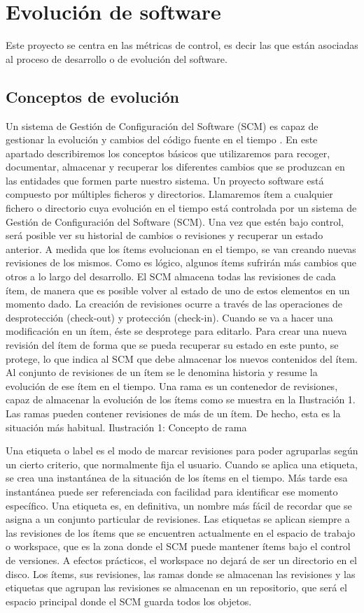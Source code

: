\section{Evolución de software}
Este proyecto se centra en las métricas de control, es decir las que están asociadas al proceso de desarrollo o de evolución del software.
\subsection{Conceptos de evolución}
Un sistema de Gestión de Configuración del Software (SCM) es capaz de gestionar la evolución y cambios del código fuente en el tiempo \cite{berczuk_software_2002, sommerville_software_2016}.
En este apartado describiremos los conceptos básicos que utilizaremos para recoger, documentar, almacenar y recuperar los diferentes cambios que se produzcan en las entidades que formen parte nuestro sistema.
Un proyecto software está compuesto por múltiples ficheros y directorios. Llamaremos ítem a cualquier fichero o directorio cuya evolución en el tiempo está controlada por un sistema de Gestión de Configuración del Software (SCM). Una vez que estén bajo control, será posible ver su historial de cambios o revisiones y recuperar un estado anterior.
A medida que los ítems evolucionan en el tiempo, se van creando nuevas revisiones de los mismos. Como es lógico, algunos ítems sufrirán más cambios que otros a lo largo del desarrollo. El SCM almacena todas las revisiones de cada ítem, de manera que es posible volver al estado de uno de estos elementos en un momento dado.
La creación de revisiones ocurre a través de las operaciones de desprotección (check-out) y protección (check-in). Cuando se va a hacer una modificación en un ítem, éste se desprotege para editarlo. Para crear una nueva revisión del ítem de forma que se pueda recuperar su estado en este punto, se protege, lo que indica al SCM que debe almacenar los nuevos contenidos del ítem.
Al conjunto de revisiones de un ítem se le denomina historia y resume la evolución de ese ítem en el tiempo.
Una rama es un contenedor de revisiones, capaz de almacenar la evolución de los ítems como se muestra en la Ilustración 1. Las ramas pueden contener revisiones de más de un ítem. De hecho, esta es la situación más habitual.
Ilustración 1: Concepto de rama

Una etiqueta o label es el modo de marcar revisiones para poder agruparlas según un cierto criterio, que normalmente fija el usuario. Cuando se aplica una etiqueta, se crea una instantánea de la situación de los ítems en el tiempo. Más tarde esa instantánea puede ser referenciada con facilidad para identificar ese momento específico. Una etiqueta es, en definitiva, un nombre más fácil de recordar que se asigna a un conjunto particular de revisiones.
Las etiquetas se aplican siempre a las revisiones de los ítems que se encuentren actualmente en el espacio de trabajo o workspace, que es la zona donde el SCM puede mantener ítems bajo el control de versiones. A efectos prácticos, el workspace no dejará de ser un directorio en el disco.
Los ítems, sus revisiones, las ramas donde se almacenan las revisiones y las etiquetas que agrupan las revisiones se almacenan en un repositorio, que será el espacio principal donde el SCM guarda todos los objetos.


